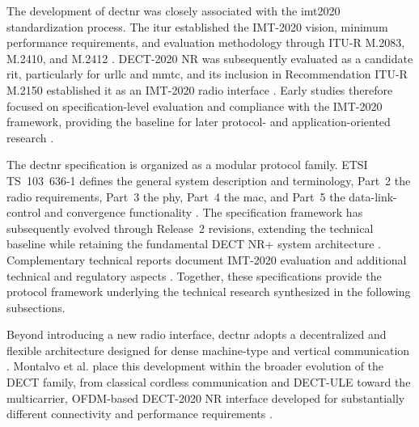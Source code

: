 The development of \gls{dectnr} was closely associated with the
\gls{imt2020} standardization process. The \gls{itur} established the
IMT-2020 vision, minimum performance requirements, and evaluation methodology
through ITU-R M.2083, M.2410, and M.2412
\cite{itur_m2083,itur_m2410,itur_m2412}. DECT-2020 NR was subsequently
evaluated as a candidate \gls{rit}, particularly for \gls{urllc} and
\gls{mmtc}, and its inclusion in Recommendation ITU-R M.2150 established it
as an IMT-2020 radio interface
\cite{itur_m2150,
maliatsosEvaluationIMT2020Candidate2022a,
smidaETSIDECT2020Component2023}. Early studies therefore focused on
specification-level evaluation and compliance with the IMT-2020 framework,
providing the baseline for later protocol- and application-oriented research
\cite{maliatsosEvaluationIMT2020Candidate2022a,
smidaETSIDECT2020Component2023}.

The \gls{dectnr} specification is organized as a modular protocol family.
ETSI TS~103~636-1 defines the general system description and terminology,
Part~2 the radio requirements, Part~3 the \gls{phy}, Part~4 the \gls{mac},
and Part~5 the data-link-control and convergence functionality
\cite{etsi_ts103636_1,
etsi_ts103636_2,
etsi_ts103636_3,
etsi_ts103636_4,
etsi_ts103636_5}. The specification framework has subsequently evolved through
Release~2 revisions, extending the technical baseline while retaining the
fundamental DECT NR+ system architecture
\cite{etsi_ts_103636_1_r2,
etsi_ts_103636_3_r2,
etsi_ts_103636_4_r2}. Complementary technical reports document IMT-2020
evaluation and additional technical and regulatory aspects
\cite{etsi_tr103810,etsi_tr103943,etsi_tr_103810}. Together, these
specifications provide the protocol framework underlying the technical
research synthesized in the following subsections.

Beyond introducing a new radio interface, \gls{dectnr} adopts a decentralized
and flexible architecture designed for dense machine-type and vertical
communication
\cite{kovalchukovDECT2020NewRadio2022,
perez-guiraoDECTNRUnveiling2022}. Montalvo et al. place this development within
the broader evolution of the DECT family, from classical cordless
communication and DECT-ULE toward the multicarrier, OFDM-based DECT-2020 NR
interface developed for substantially different connectivity and performance
requirements
\cite{montalvoDECTEvolutionMeeting2024}.

